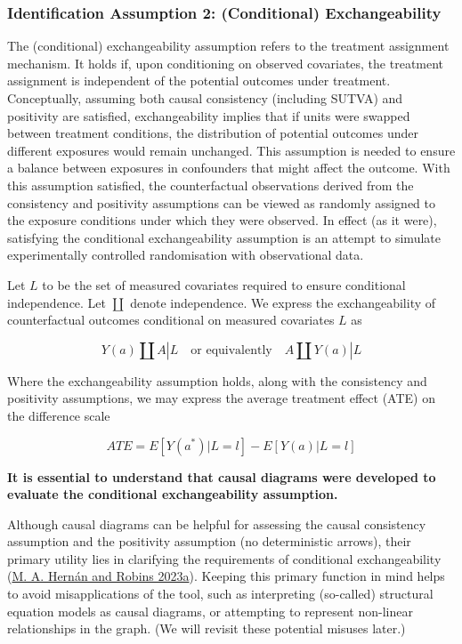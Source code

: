 \documentclass[
  singlecolumn]{article}
\begin{document}
\hypertarget{identification-assumption-2-conditional-exchangeability}{%
\subsubsection{Identification Assumption 2: (Conditional)
Exchangeability}\label{identification-assumption-2-conditional-exchangeability}}

The (conditional) exchangeability assumption refers to the treatment
assignment mechanism. It holds if, upon conditioning on observed
covariates, the treatment assignment is independent of the potential
outcomes under treatment. Conceptually, assuming both causal consistency
(including SUTVA) and positivity are satisfied, exchangeability implies
that if units were swapped between treatment conditions, the
distribution of potential outcomes under different exposures would
remain unchanged. This assumption is needed to ensure a balance between
exposures in confounders that might affect the outcome. With this
assumption satisfied, the counterfactual observations derived from the
consistency and positivity assumptions can be viewed as randomly
assigned to the exposure conditions under which they were observed. In
effect (as it were), satisfying the conditional exchangeability
assumption is an attempt to simulate experimentally controlled
randomisation with observational data.

Let \(L\) to be the set of measured covariates required to ensure
conditional independence. Let \(\coprod\) denote independence. We
express the exchangeability of counterfactual outcomes conditional on
measured covariates \(L\) as

\[
Y(a) \coprod  A|L \quad \text{or equivalently} \quad A \coprod  Y(a)|L
\]

Where the exchangeability assumption holds, along with the consistency
and positivity assumptions, we may express the average treatment effect
(ATE) on the difference scale

\[
ATE = E[Y(a^*)|L = l] - E[Y(a)|L = l]
\]

\textbf{It is essential to understand that causal diagrams were
developed to evaluate the conditional exchangeability assumption.}

Although causal diagrams can be helpful for assessing the causal
consistency assumption and the positivity assumption (no deterministic
arrows), their primary utility lies in clarifying the requirements of
conditional exchangeability (\protect\hyperlink{ref-hernuxe1n2023}{M. A.
Hernán and Robins 2023a}). Keeping this primary function in mind helps
to avoid misapplications of the tool, such as interpreting (so-called)
structural equation models as causal diagrams, or attempting to
represent non-linear relationships in the graph. (We will revisit these
potential misuses later.)
\end{document}
